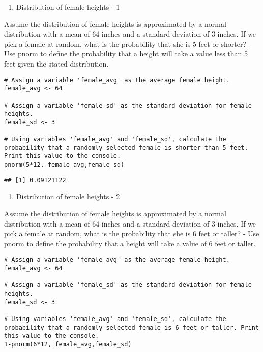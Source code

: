 \documentclass[
]{article}
\providecommand{\tightlist}{%
  \setlength{\itemsep}{0pt}\setlength{\parskip}{0pt}}
\begin{document}
\begin{enumerate}
\def\labelenumi{\arabic{enumi}.}
\tightlist
\item
  Distribution of female heights - 1
\end{enumerate}

Assume the distribution of female heights is approximated by a normal
distribution with a mean of 64 inches and a standard deviation of 3
inches. If we pick a female at random, what is the probability that she
is 5 feet or shorter? - Use pnorm to define the probability that a
height will take a value less than 5 feet given the stated distribution.

\begin{verbatim}
# Assign a variable 'female_avg' as the average female height.
female_avg <- 64

# Assign a variable 'female_sd' as the standard deviation for female heights.
female_sd <- 3

# Using variables 'female_avg' and 'female_sd', calculate the probability that a randomly selected female is shorter than 5 feet. Print this value to the console.
pnorm(5*12, female_avg,female_sd)
\end{verbatim}

\begin{verbatim}
## [1] 0.09121122
\end{verbatim}

\begin{enumerate}
\def\labelenumi{\arabic{enumi}.}
\setcounter{enumi}{1}
\tightlist
\item
  Distribution of female heights - 2
\end{enumerate}

Assume the distribution of female heights is approximated by a normal
distribution with a mean of 64 inches and a standard deviation of 3
inches. If we pick a female at random, what is the probability that she
is 6 feet or taller? - Use pnorm to define the probability that a height
will take a value of 6 feet or taller.

\begin{verbatim}
# Assign a variable 'female_avg' as the average female height.
female_avg <- 64

# Assign a variable 'female_sd' as the standard deviation for female heights.
female_sd <- 3

# Using variables 'female_avg' and 'female_sd', calculate the probability that a randomly selected female is 6 feet or taller. Print this value to the console.
1-pnorm(6*12, female_avg,female_sd)
\end{verbatim}
\end{document}

